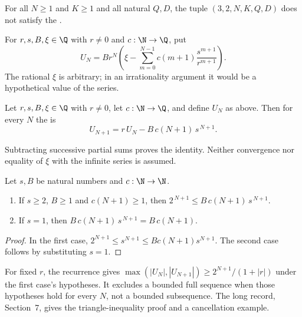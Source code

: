 \documentclass[11pt]{article}
\begin{document}
\begin{theorem}\label{res:nocorridor}
For all $N\ge1$ and $K\ge1$ and all natural $Q,D$, the tuple
$(3,2,N,K,Q,D)$ does not satisfy the
.
\end{theorem}

For $r,s,B,\xi\in\Q$ with $r\ne0$ and $c:\N\to\Q$, put
\[
 U_N=Br^N\left(\xi-\sum_{m=0}^{N-1}
 c(m+1)\frac{s^{m+1}}{r^{m+1}}\right).
\]
The rational $\xi$ is arbitrary; in an irrationality argument it would
be a hypothetical value of the series.

\begin{theorem}\label{res:tailrec}
Let $r,s,B,\xi\in\Q$ with $r\ne0$, let $c:\N\to\Q$, and define $U_N$
as above. Then for every $N$ the
is
\[
 U_{N+1}=r\,U_N-B\,c(N+1)\,s^{\,N+1}.
\]
\end{theorem}
Subtracting successive partial sums proves the identity. Neither
convergence nor equality of $\xi$ with the infinite series is assumed.


\begin{theorem}\label{res:forcing}
Let $s,B$ be natural numbers and $c:\N\to\N$.
\begin{enumerate}
\item If $s\ge2$, $B\ge1$ and $c(N+1)\ge1$, then
$2^{\,N+1}\le B\,c(N+1)\,s^{\,N+1}$.
\item If $s=1$, then $B\,c(N+1)\,s^{\,N+1}=B\,c(N+1)$.
\end{enumerate}
\end{theorem}
\begin{proof}
In the first case, $2^{N+1}\le s^{N+1}\le Bc(N+1)s^{N+1}$.
The second case follows by substituting $s=1$.
\end{proof}
For fixed $r$, the recurrence gives
$\max(|U_N|,|U_{N+1}|)\ge2^{N+1}/(1+|r|)$ under the first case's
hypotheses. It excludes a bounded full sequence when those hypotheses
hold for every $N$, not a bounded subsequence. The long record,
Section~7, gives the triangle-inequality proof and a cancellation example.
\end{document}

